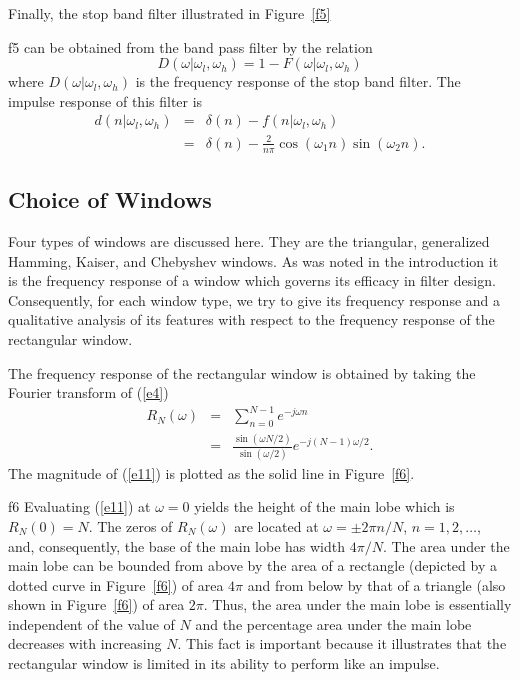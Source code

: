 	Finally, the stop band filter illustrated in Figure~\ref{f5}
%

{f5}
%
can be obtained from the band pass filter by the relation
%
\begin{equation}
D(\omega|\omega_l,\omega_h)=1-F(\omega|\omega_l,\omega_h)
\label{e9}
\end{equation}
%
where $D(\omega|\omega_l,\omega_h)$ is the frequency response of the stop
band filter.  The impulse response of this filter is
%
\begin{eqnarray}
d(n|\omega_l,\omega_h) &=& \delta(n)-f(n|\omega_l,\omega_h) \\
                       &=& \delta(n)-\frac{2}{n\pi}\cos(\omega_1n)\sin(\omega_2n).
\label{e10}
\end{eqnarray}
%
\subsection{Choice of Windows}
\label{s3}

Four types of windows are discussed
here.  They are the triangular, generalized Hamming,
Kaiser, and Chebyshev windows.  As was noted in the introduction it is the
frequency response of  a window
which governs its efficacy in filter design.  Consequently, for
each window type, we try to give its frequency response and a
qualitative analysis of its features with respect to the frequency 
response of the rectangular window.

	The frequency response of the rectangular window
 is obtained
by taking the Fourier transform of (\ref{e4})
%
\begin{eqnarray}
R_N(\omega) &=& \sum_{n=0}^{N-1}e^{-j\omega n} \\
            &=& \frac{\sin(\omega N/2)}{\sin(\omega/2)}e^{-j(N-1)\omega/2}.
\label{e11}
\end{eqnarray}
%
The magnitude of (\ref{e11}) is plotted as the solid line in Figure~\ref{f6}.
%

{f6}
%
Evaluating (\ref{e11}) at $\omega=0$ yields the height of the 
main lobe which is $R_N(0)=N$.  The zeros of $R_N(\omega)$ are
located at $\omega=\pm2\pi n/N$, $n=1,2,\ldots$, and, consequently,
the base of the main lobe has width $4\pi/N$.  The area
under the main lobe can be bounded from above by the area of a
rectangle (depicted by a dotted curve in Figure~\ref{f6})
of area $4\pi$ and from
below by that of a triangle (also shown in Figure~\ref{f6}) of area $2\pi$.
Thus, the area under the main lobe is essentially independent
of the value of $N$ and the percentage area under the 
main lobe decreases with increasing $N$.  This fact is
important  because it illustrates 
that the rectangular window is limited
in its ability to perform like an impulse.

